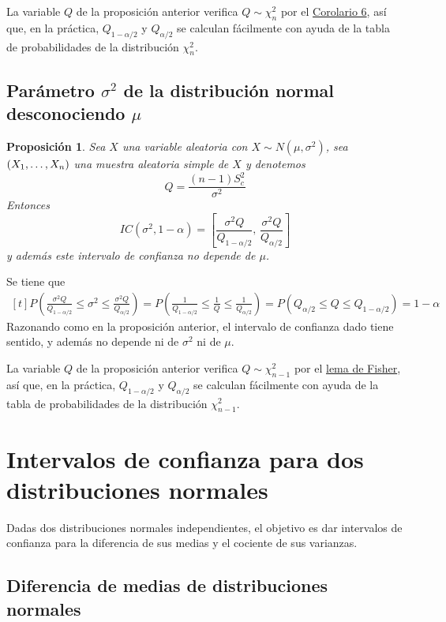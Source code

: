 \documentclass[11pt]{report}
\makeatletter
\renewenvironment{proof}[1][\proofname]{\par
  \pushQED{\qed}%
  \normalfont \topsep\z@skip %
  \trivlist
  \item[\hskip\labelsep
        \itshape
    #1\@addpunct{.}]\ignorespaces
}{%
  \popQED\endtrivlist\@endpefalse
}
\newtheorem{proposition}{Proposición}
\theoremstyle{definition}
\newcommand{\pars}[1]{\left( #1 \right)}
\makeatother
\begin{document}
La variable $Q$ de la proposición anterior verifica $Q \sim \chi^2_n$ por el \hyperref[cor2.17]{\color{blue}Corolario 6}, así que, en la práctica, $Q_{1-\alpha/2}$ y $Q_{\alpha/2}$ se calculan fácilmente con ayuda de la tabla de probabilidades de la distribución $\chi^2_n$.

\subsection{Parámetro \texorpdfstring{$\sigma^2$}{TEXT} de la distribución normal desconociendo \texorpdfstring{$\mu$}{TEXT}}

\begin{proposition}
Sea $X$ una variable aleatoria con $X \sim N(\mu,\sigma^2)$, sea $(X_1,\mathellipsis,X_n)$ una muestra aleatoria simple de $X$ y denotemos
\[Q =\frac{(n-1)S^2_c}{\sigma^2}\]
Entonces
\[IC(\sigma^2,1-\alpha) = \left[\frac{\sigma^2Q}{Q_{1-\alpha/2}}, \, \frac{\sigma^2Q}{Q_{\alpha/2}}\right]\]
y además este intervalo de confianza no depende de $\mu$.
\end{proposition}

\begin{proof}
Se tiene que
\[
\begin{aligned}[t]
P\pars{\frac{\sigma^2Q}{Q_{1-\alpha/2}} \leq \sigma^2 \leq \frac{\sigma^2Q}{Q_{\alpha/2}}} = P\pars{\frac{1}{Q_{1-\alpha/2}} \leq \frac{1}{Q} \leq \frac{1}{Q_{\alpha/2}}} = P\pars{Q_{\alpha/2} \leq Q 
\leq Q_{1-\alpha/2}} = 1-\alpha
\end{aligned}
\]
Razonando como en la proposición anterior, el intervalo de confianza dado tiene sentido, y además no depende ni de $\sigma^2$ ni de $\mu$.
\end{proof}

La variable $Q$ de la proposición anterior verifica $Q \sim \chi^2_{n-1}$ por el \hyperref[prop20]{\color{blue}lema de Fisher}, así que, en la práctica, $Q_{1-\alpha/2}$ y $Q_{\alpha/2}$ se calculan fácilmente con ayuda de la tabla de probabilidades de la distribución $\chi^2_{n-1}$.

\section{Intervalos de confianza para dos distribuciones normales}

Dadas dos distribuciones normales independientes, el objetivo es dar intervalos de confianza para la diferencia de sus medias y el cociente de sus varianzas.

\subsection{Diferencia de medias de distribuciones normales}
\end{document}
